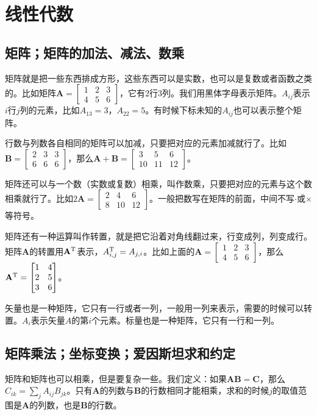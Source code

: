 \chapter{线性代数}
\section{矩阵；矩阵的加法、减法、数乘}
矩阵就是把一些东西排成方形，这些东西可以是实数，也可以是复数或者函数之类的。比如矩阵$\mathbf{A}=\begin{bmatrix}
1 & 2 & 3 \\
4 & 5 & 6
\end{bmatrix}$，它有$2$行$3$列。我们用黑体字母表示矩阵。$A_{i j}$表示$i$行$j$列的元素，比如$A_{1 3}=3$，$A_{2 2}=5$。有时候下标未知的$A_{i j}$也可以表示整个矩阵。

行数与列数各自相同的矩阵可以加减，只要把对应的元素加减就行了。比如$\mathbf{B}=\begin{bmatrix}
2 & 3 & 3 \\
6 & 6 & 6
\end{bmatrix}$，那么$\mathbf{A}+\mathbf{B}=\begin{bmatrix}
3 & 5 & 6 \\
10 & 11 & 12
\end{bmatrix}$。

矩阵还可以与一个数（实数或复数）相乘，叫作数乘，只要把对应的元素与这个数相乘就行了。比如$2 \mathbf{A}=\begin{bmatrix}
2 & 4 & 6 \\
8 & 10 & 12
\end{bmatrix}$。一般把数写在矩阵的前面，中间不写$\cdot$或$\times$等符号。

矩阵还有一种运算叫作转置，就是把它沿着对角线翻过来，行变成列，列变成行。矩阵$\mathbf{A}$的转置用$\mathbf{A}^{\mathrm{T}}$表示，$A^{\mathrm{T}}_{i, j}=A_{j, i}$。比如上面的$\mathbf{A}=\begin{bmatrix}
1 & 2 & 3 \\
4 & 5 & 6
\end{bmatrix}$，那么$\mathbf{A}^{\mathrm{T}}=\begin{bmatrix}
1 & 4 \\
2 & 5 \\
3 & 6
\end{bmatrix}$。

矢量也是一种矩阵，它只有一行或者一列，一般用一列来表示，需要的时候可以转置。$A_i$表示矢量$A$的第$i$个元素。标量也是一种矩阵，它只有一行和一列。
\section{矩阵乘法；坐标变换；爱因斯坦求和约定}
矩阵和矩阵也可以相乘，但是要复杂一些。我们定义：如果$\mathbf{A} \mathbf{B}=\mathbf{C}$，那么$C_{i k}=\sum_j A_{i j} B_{j k}$。只有$\mathbf{A}$的列数与$\mathbf{B}$的行数相同才能相乘，求和的时候$j$的取值范围是$\mathbf{A}$的列数，也是$\mathbf{B}$的行数。

